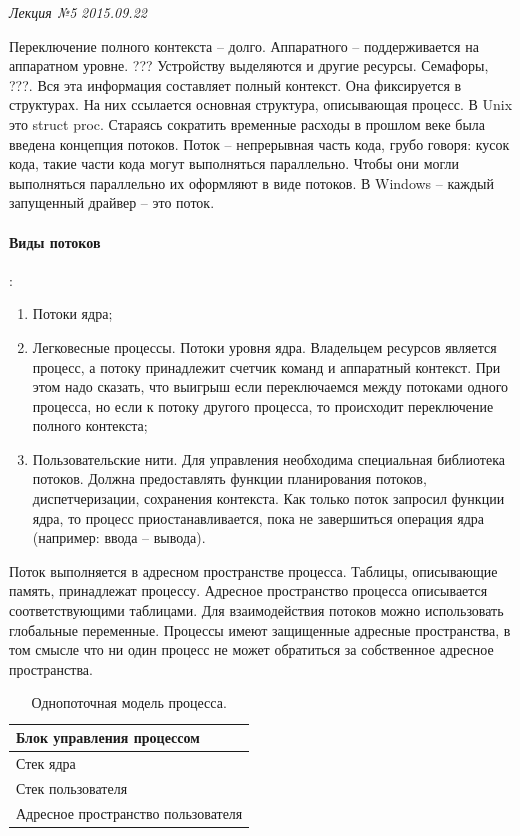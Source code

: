 \clearpage
\begin{flushright}
	\textit{Лекция №5}
	\textit{2015.09.22}
\end{flushright}

Переключение полного контекста – долго. Аппаратного – поддерживается на аппаратном уровне.
???
Устройству выделяются и другие ресурсы. Семафоры, ???. Вся эта информация составляет полный контекст. Она фиксируется в структурах. На них ссылается основная структура, описывающая процесс. В Unix это struct proc. Стараясь сократить временные расходы в прошлом веке была введена концепция потоков. Поток – непрерывная часть кода, грубо говоря: кусок кода, такие части кода могут выполняться параллельно. Чтобы они могли выполняться параллельно их оформляют в виде потоков. 
В Windows – каждый запущенный драйвер – это поток. 

\paragraph{Виды потоков}: 
\begin{enumerate}
    \item Потоки ядра;
    \item Легковесные процессы. Потоки уровня ядра. Владельцем ресурсов является процесс, а потоку принадлежит счетчик команд и аппаратный контекст. При этом надо сказать, что выигрыш если переключаемся между потоками одного процесса, но если к потоку другого процесса, то происходит переключение полного контекста;
    \item Пользовательские нити. Для управления необходима специальная библиотека потоков. Должна предоставлять функции планирования потоков, диспетчеризации, сохранения контекста. Как только поток запросил функции ядра, то процесс приостанавливается, пока не завершиться операция ядра (например: ввода – вывода).
\end{enumerate}

Поток выполняется в адресном пространстве процесса. Таблицы, описывающие память, принадлежат процессу. Адресное пространство процесса описывается соответствующими таблицами. Для взаимодействия потоков можно использовать глобальные переменные. Процессы имеют защищенные адресные пространства, в том смысле что ни один процесс не может обратиться за собственное адресное пространства.

\begin{table}[H]
\caption{Однопоточная модель процесса.}
\begin{tabular}{|l|}
\hline
Блок управления процессом\\
\hline
Стек ядра\\
\hline
Стек пользователя\\
\hline
Адресное пространство пользователя\\
\hline
\end{tabular}
\end{table}


